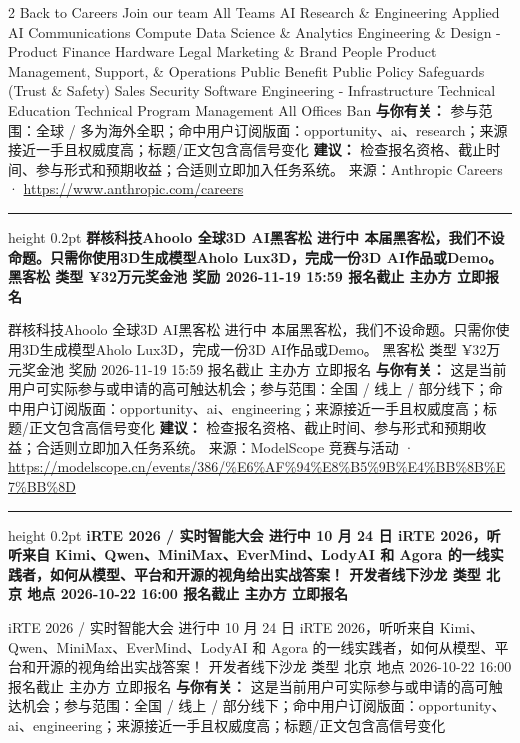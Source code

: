 \documentclass[10.5pt]{ctexart}
\begin{document}
\begin{multicols}{2}
Back to Careers Join our team All Teams AI Research \& Engineering Applied AI Communications Compute Data Science \& Analytics Engineering \& Design - Product Finance Hardware Legal Marketing \& Brand People Product Management, Support, \& Operations Public Benefit Public Policy Safeguards (Trust \& Safety) Sales Security Software Engineering - Infrastructure Technical Education Technical Program Management All Offices Ban
\textbf{与你有关：} 参与范围：全球 / 多为海外全职；命中用户订阅版面：opportunity、ai、research；来源接近一手且权威度高；标题/正文包含高信号变化
\textbf{建议：} 检查报名资格、截止时间、参与形式和预期收益；合适则立即加入任务系统。
{\footnotesize\color{ormuted} 来源：Anthropic Careers · \url{https://www.anthropic.com/careers}}
\vspace{2mm}
\hrule height 0.2pt
\vspace{2mm}
{\large\bfseries 群核科技Ahoolo 全球3D AI黑客松 进行中 本届黑客松，我们不设命题。只需你使用3D生成模型Aholo Lux3D，完成一份3D AI作品或Demo。 黑客松 类型 ¥32万元奖金池 奖励 2026-11-19 15:59 报名截止 主办方 立即报名}\par
群核科技Ahoolo 全球3D AI黑客松 进行中 本届黑客松，我们不设命题。只需你使用3D生成模型Aholo Lux3D，完成一份3D AI作品或Demo。 黑客松 类型 ¥32万元奖金池 奖励 2026-11-19 15:59 报名截止 主办方 立即报名
\textbf{与你有关：} 这是当前用户可实际参与或申请的高可触达机会；参与范围：全国 / 线上 / 部分线下；命中用户订阅版面：opportunity、ai、engineering；来源接近一手且权威度高；标题/正文包含高信号变化
\textbf{建议：} 检查报名资格、截止时间、参与形式和预期收益；合适则立即加入任务系统。
{\footnotesize\color{ormuted} 来源：ModelScope 竞赛与活动 · \url{https://modelscope.cn/events/386/%E6%AF%94%E8%B5%9B%E4%BB%8B%E7%BB%8D}}
\vspace{2mm}
\hrule height 0.2pt
\vspace{2mm}
{\large\bfseries iRTE 2026 / 实时智能大会 进行中 10 月 24 日 iRTE 2026，听听来自 Kimi、Qwen、MiniMax、EverMind、LodyAI 和 Agora 的一线实践者，如何从模型、平台和开源的视角给出实战答案！ 开发者线下沙龙 类型 北京 地点 2026-10-22 16:00 报名截止 主办方 立即报名}\par
iRTE 2026 / 实时智能大会 进行中 10 月 24 日 iRTE 2026，听听来自 Kimi、Qwen、MiniMax、EverMind、LodyAI 和 Agora 的一线实践者，如何从模型、平台和开源的视角给出实战答案！ 开发者线下沙龙 类型 北京 地点 2026-10-22 16:00 报名截止 主办方 立即报名
\textbf{与你有关：} 这是当前用户可实际参与或申请的高可触达机会；参与范围：全国 / 线上 / 部分线下；命中用户订阅版面：opportunity、ai、engineering；来源接近一手且权威度高；标题/正文包含高信号变化

\end{multicols}
\end{document}
